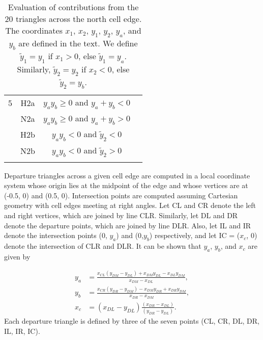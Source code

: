 \begin{table}
\begin{center}
\begin{tabular}{cccc}
5         &    H2a     &  $y_a y_b\geq 0$ and $y_a+y_b<0$      \\
          &    N2a     &  $y_a y_b\geq 0$ and $y_a+y_b>0$      \\
          &    H2b     &  $y_a y_b<0$ and $\tilde{y}_2<0$      \\
          &    N2b     &  $y_a y_b<0$ and $\tilde{y}_2>0$      \\
          &            &                                       \\
\hline
\end{tabular}
\caption{\label{table:triangles} Evaluation of contributions from the 20 triangles across
the north cell edge.  The coordinates $x_1$, $x_2$, $y_1$, $y_2$,
$y_a$, and $y_b$ are defined in the text. We define $\tilde{y}_1 =
y_1$ if $x_1>0$, else $\tilde{y}_1 = y_a$. Similarly, $\tilde{y}_2
= y_2$ if $x_2<0$, else $\tilde{y}_2 = y_b$.}
\end{center}
\end{table}

Departure triangles across a given cell edge are computed in a local coordinate system whose origin 
lies at the midpoint of the edge and whose vertices are at (-0.5, 0) and (0.5, 0).  
Intersection points are computed assuming Cartesian geometry with cell edges meeting at right angles.  
Let CL and CR denote the left and right vertices, which are joined by line CLR.   
Similarly, let DL and DR denote the departure points, which are joined by line DLR.  
Also, let IL and IR denote the intersection points (0, $y_a$) and (0,$y_b$) respectively, and 
let IC = ($x_c$, 0) denote the intersection of CLR and DLR.  
It can be shown that $y_a$, $y_b$, and $x_c$ are given by

\begin{equation}
  \begin{aligned}
    y_a &= \frac {{x_{CL} (y_{DM}-y_{DL}) + x_{DM}y_{DL} - x_{DL}y_{DM}}} {x_{DM} - x_{DL}}, \\
    y_b &= \frac {{x_{CR} (y_{DR}-y_{DM}) - x_{DM}y_{DR} + x_{DR}y_{DM}}} {x_{DR} - x_{DM}}, \\
    x_c &= (x_{DL} - y_{DL}) \frac{(x_{DR} - x_{DL})} {(y_{DR} - y_{DL})}.
  \end{aligned}
\end{equation}
Each departure triangle is defined by three of the seven points (CL, CR, DL, DR, IL, IR, IC).



